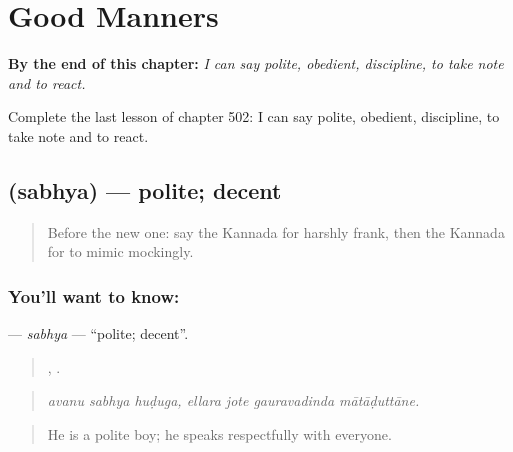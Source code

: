 
\chapter{Good Manners}
\label{ch:ka-good-manners}

\begin{chapteropening}
\textbf{By the end of this chapter:} \emph{I can say polite, obedient, discipline, to take note and to react.}

Complete the last lesson of chapter 502: I can say polite, obedient, discipline, to take note and to react.
\end{chapteropening}

\section[\texorpdfstring{\kn{ಸಭ್ಯ} (sabhya)}{ಸಭ್ಯ (sabhya)}]{ (sabhya) — polite; decent}

\label{lesson:KA-C502-sabhya}



\begin{quote}
Before the new one: say the Kannada for harshly frank, then the Kannada for to mimic mockingly.
\end{quote}

\subsection*{You'll want to know: }
\textbf{} — \emph{sabhya} — \textquotedblleft{}polite; decent\textquotedblright{}.

\begin{quote}
  ,    .
\end{quote}

\begin{quote}
\emph{avanu sabhya huḍuga, ellara jote gauravadinda mātāḍuttāne.}
\end{quote}

\begin{quote}
He is a polite boy; he speaks respectfully with everyone.
\end{quote}

